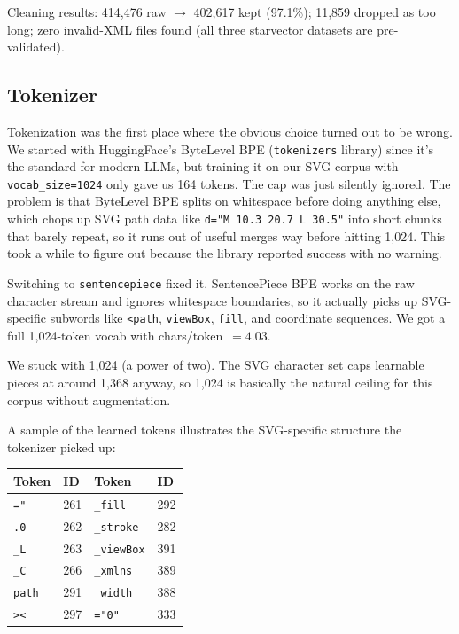 \documentclass[10pt,letterpaper]{article}
\begin{document}
Cleaning results: 414,476 raw $\to$ 402,617 kept (97.1\%); 11,859 dropped
as too long; zero invalid-XML files found (all three starvector datasets are
pre-validated).

\subsection{Tokenizer}

Tokenization was the first place where the obvious choice turned out to be wrong. We started with HuggingFace's ByteLevel BPE (\texttt{tokenizers} library) since it's the standard for modern LLMs, but training it on our SVG corpus with \texttt{vocab\_size=1024} only gave us 164 tokens. The cap was just silently ignored. The problem is that ByteLevel BPE splits on whitespace before doing anything else, which chops up SVG path data like \texttt{d="M 10.3 20.7 L 30.5"} into short chunks that barely repeat, so it runs out of useful merges way before hitting 1,024. This took a while to figure out because the library reported success with no warning.

Switching to \texttt{sentencepiece} fixed it. SentencePiece BPE works on the raw character stream and ignores whitespace boundaries, so it actually picks up SVG-specific subwords like \texttt{<path}, \texttt{viewBox}, \texttt{fill}, and coordinate sequences. We got a full 1,024-token vocab with chars/token~$= 4.03$.

We stuck with 1,024 (a power of two). The SVG character set caps learnable pieces at around 1,368 anyway, so 1,024 is basically the natural ceiling for this corpus without augmentation.

A sample of the learned tokens illustrates the SVG-specific structure the tokenizer picked up:

\begin{center}
\begin{tabular}{llll}
\toprule
Token & ID & Token & ID \\
\midrule
\texttt{="} & 261 & \texttt{\_fill} & 292 \\
\texttt{.0} & 262 & \texttt{\_stroke} & 282 \\
\texttt{\_L} & 263 & \texttt{\_viewBox} & 391 \\
\texttt{\_C} & 266 & \texttt{\_xmlns} & 389 \\
\texttt{path} & 291 & \texttt{\_width} & 388 \\
\texttt{><} & 297 & \texttt{="0"} & 333 \\
\bottomrule
\end{tabular}
\end{center}
\end{document}
